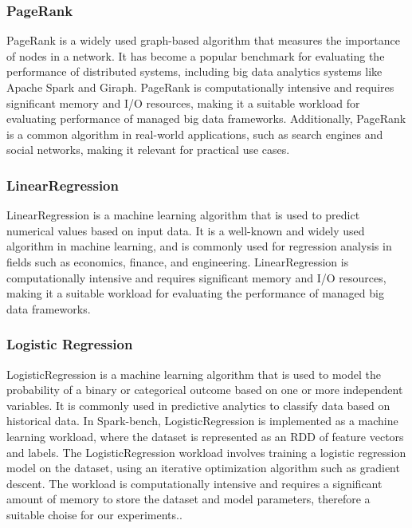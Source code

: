 \subsubsection{PageRank}
PageRank is a widely used graph-based algorithm that measures the
importance of nodes in a network. It has become a popular benchmark
for evaluating the performance of distributed systems, including big
data analytics systems like Apache Spark and Giraph. PageRank is computationally
intensive and requires significant memory and I/O resources, making it
a suitable workload for evaluating performance of managed big data frameworks. Additionally, PageRank is a
common algorithm in real-world applications, such as search engines
and social networks, making it relevant for practical use cases.

\subsubsection{LinearRegression}
LinearRegression is a machine learning algorithm that is used to
predict numerical values based on input data. It is a well-known and
widely used algorithm in machine learning, and is commonly used for
regression analysis in fields such as economics, finance, and
engineering. LinearRegression is computationally intensive and
requires significant memory and I/O resources, making it a suitable
workload for evaluating the performance of managed big data frameworks.

\subsubsection{Logistic Regression}
LogisticRegression is a machine learning algorithm that is used to
model the probability of a binary or categorical outcome based on one
or more independent variables. It is commonly used in predictive
analytics to classify data based on historical data. In Spark-bench,
LogisticRegression is implemented as a machine learning workload,
where the dataset is represented as an RDD of feature vectors and
labels. The LogisticRegression workload involves training a logistic
regression model on the dataset, using an iterative optimization
algorithm such as gradient descent. The workload is computationally
intensive and requires a significant amount of memory to store the
dataset and model parameters, therefore a suitable choise for our experiments..

